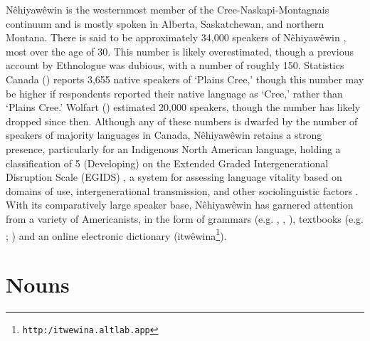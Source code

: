 Nêhiyawêwin is the westernmost member of the Cree-Naskapi-Montagnais continuum and is mostly spoken in Alberta, Saskatchewan, and northern Montana. There is said to be approximately 34,000 speakers of Nêhiyawêwin \citep{Ethnologue2016}, most over the age of 30. This number is likely overestimated, though a previous account by Ethnologue was dubious, with a number of roughly 150. Statistics Canada (\citeyear{StatsCan}) reports 3,655 native speakers of `Plains Cree,' though this number may be higher if respondents reported their native language as `Cree,' rather than `Plains Cree.' Wolfart (\citeyear{Wolfart1973}) estimated 20,000 speakers, though the number has likely dropped since then. Although any of these numbers is dwarfed by the number of speakers of majority languages in Canada, Nêhiyawêwin retains a strong presence, particularly for an Indigenous North American language, holding a classification of 5 (Developing) on the Extended Graded Intergenerational Disruption Scale (EGIDS) \citep{Ethnologue2016}, a system for assessing language vitality based on domains of use, intergenerational transmission, and other sociolinguistic factors \citep{LewisSimons2010}. With its comparatively large speaker base, Nêhiyawêwin has garnered attention from a variety of Americanists, in the form of grammars (e.g. \citeauthor{Wolfart1973} \citeyear{Wolfart1973}, \citeauthor{Dahlstrom2014} \citeyear{Dahlstrom2014}, \citeauthor{Wolvengrey2011} \citeyear{Wolvengrey2011}), textbooks (e.g. \citeauthor{okimasis2018cree} \citeyear{okimasis2018cree}; \citeauthor{Ratt2016} \citeyear{Ratt2016}) and an online electronic dictionary (itw\^{e}wina\footnote{\texttt{http:/itwewina.altlab.app}}).

\section{Nouns}

